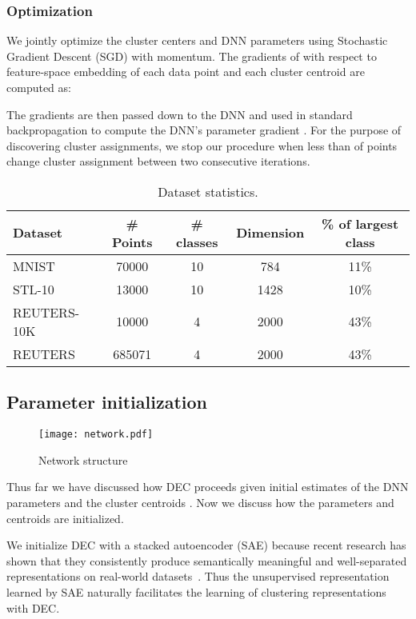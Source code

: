 \documentclass{article}
\begin{document}
\subsubsection{Optimization}
We jointly optimize the cluster centers  and DNN parameters  using Stochastic Gradient Descent (SGD) with momentum. The gradients of  with respect to feature-space embedding of each data point  and each cluster centroid  are computed as:

The gradients  are then passed down to the DNN and used in standard backpropagation to compute the DNN's parameter gradient .
For the purpose of discovering cluster assignments, we stop our procedure when less than  of points change cluster assignment between two consecutive iterations.

\begin{table*}[!t]
\centering
\caption{Dataset statistics.}
\begin{tabular}{l|c|c|c|c} 
Dataset  & \# Points & \# classes & Dimension & \% of largest class \\ \hline \hline
MNIST \cite{lecun1998gradient}   & 70000     & 10         & 784       & 11\%                \\ \hline
STL-10 \cite{coates2011analysis} & 13000     & 10         & 1428      & 10\%                \\ \hline
REUTERS-10K & 10000     & 4          & 2000      & 43\%                \\ \hline
REUTERS \cite{lewis2004rcv1} & 685071     & 4          & 2000      & 43\%                \\
\end{tabular}
\label{table:dataset}
\end{table*}

\subsection{Parameter initialization}
\begin{figure}[t!]
\centering
\texttt{[image: network.pdf]}
\caption{Network structure}
\label{fig:network}
\end{figure}

Thus far we have discussed how DEC proceeds given initial estimates of the DNN parameters  and the cluster centroids .
Now we discuss how the parameters and centroids are initialized.

We initialize DEC with a stacked autoencoder (SAE) because recent research has shown that they consistently produce semantically meaningful and well-separated representations on real-world datasets~\citep{vincent2010stacked,hinton2006reducing,le2013building}. Thus the unsupervised representation learned by SAE naturally facilitates the learning of clustering representations with DEC.
\end{document}
